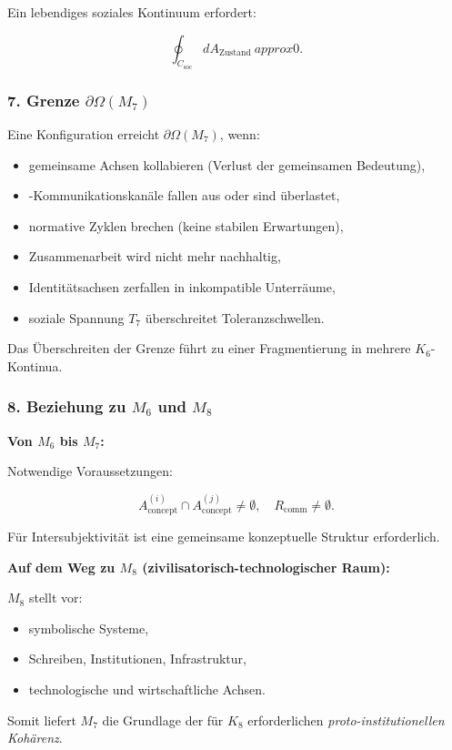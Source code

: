 Ein lebendiges soziales Kontinuum erfordert:

\[
\oint_{C_{\mathrm{soc}}} dA_{\mathrm{Zustand}} \ approx 0.
\]

\subsubsection*{7. Grenze \texorpdfstring{$\partial\Omega(M_7)$}{\partial\Omega(M_7)}}

Eine Konfiguration erreicht $\partial\Omega(M_7)$, wenn:

\begin{itemize}
    \item gemeinsame Achsen kollabieren (Verlust der gemeinsamen Bedeutung),
    \item-Kommunikationskanäle fallen aus oder sind überlastet,
    \item normative Zyklen brechen (keine stabilen Erwartungen),
    \item Zusammenarbeit wird nicht mehr nachhaltig,
    \item Identitätsachsen zerfallen in inkompatible Unterräume,
    \item soziale Spannung $T_7$ überschreitet Toleranzschwellen.
\end{itemize}

Das Überschreiten der Grenze führt zu einer Fragmentierung in mehrere $K_6$-Kontinua.

\subsubsection*{8. Beziehung zu \texorpdfstring{$M_6$}{M_6} und \texorpdfstring{$M_8$}{M_8}}

\textbf{Von $M_6$ bis $M_7$:}

Notwendige Voraussetzungen:

\[
A_{\mathrm{concept}}^{(i)} \cap A_{\mathrm{concept}}^{(j)} \neq \emptyset,
\quad
R_{\mathrm{comm}} \neq \emptyset.
\]

Für Intersubjektivität ist eine gemeinsame konzeptuelle Struktur erforderlich.

\textbf{Auf dem Weg zu $M_8$ (zivilisatorisch-technologischer Raum):}

$M_8$ stellt vor:

\begin{itemize}
    \item symbolische Systeme,
    \item Schreiben, Institutionen, Infrastruktur,
    \item technologische und wirtschaftliche Achsen.
\end{itemize}

Somit liefert $M_7$ die Grundlage der für $K_8$ erforderlichen \emph{proto-institutionellen Kohärenz}.
